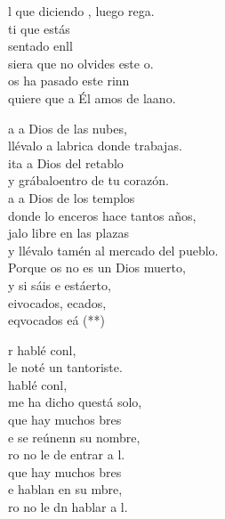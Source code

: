 \documentclass[12pt]{article}
\begin{document}
\begin{multicols*}{2}
\begin{cancion}
	l que diciendo , luego rega.\\
	ti que estás \\
	sentado enll  \\
	siera que no olvides este o.\\
	os ha pasado  este rinn \\
	quiere que a Él amos de laano.\\
\end{cancion}%

\begin{cancion}%
	\begin{chorus}%
	a a Dios de las nubes,\\
	llévalo a labrica donde trabajas. \\
	ita a Dios del retablo\\
	y grábaloentro de tu corazón.\\
	a a Dios de los templos\\
	donde lo enceros hace tantos años,\\
	jalo libre en las plazas \\
	y llévalo tamén al mercado del pueblo.\\
	Porque os no es un Dios muerto,\\
	y si sáis e estáerto, \\
	eivocados, ecados,\\
	eqvocados eá (**)\\
	\end{chorus}%
	r hablé conl,\\
	le noté un tantoriste.\\
	 hablé conl,\\
	me ha dicho questá solo,\\
	que hay muchos bres\\
	e se reúnenn su nombre,\\
	ro no le de entrar a l.\\
	que hay muchos bres\\
	e hablan en su mbre,\\
	ro no le dn hablar a l.\\
\end{cancion}%


\end{multicols*}
\end{document}
